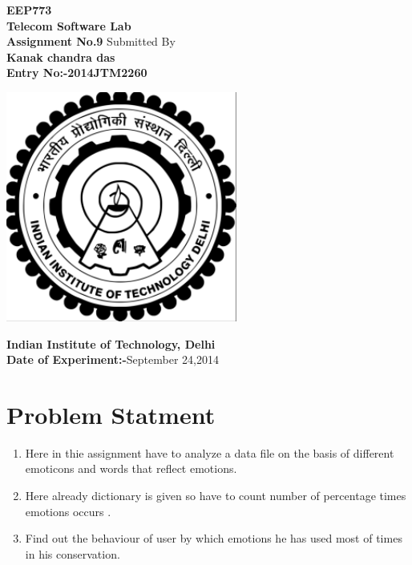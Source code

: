 \documentclass[a4paper,10pt]{report}
\date{}
\begin{document}
\begin{titlepage}
\centering
\vfill
\textbf{\Huge{EEP773
\linebreak
\\Telecom Software Lab}}\\
\vspace{2cm}
\textbf{\Large{Assignment No.9\vskip1cm}}
\vskip2cm
\large{Submitted By}\vskip0.02cm
\Large{\textbf{\\Kanak chandra das\\
Entry No:-2014JTM2260}}
\vskip1.5cm
\begin{center}
 \includegraphics[bb=0 0 384 360,scale=0.35]{./iitd_logo.png}
\end{center}

\vskip1cm
\textbf{
Indian Institute of Technology, Delhi\\
\vskip0.5cm
Date of Experiment:-}September 24,2014
\vfill
\end{titlepage}

\newpage
\tableofcontents
\newpage
\listoffigures
\newpage
\section{Problem Statment}
\begin{enumerate}
 \item Here in thie assignment have to analyze a data file on the basis of different emoticons and words that reflect emotions.
 \item Here already dictionary is given so have to count number of percentage times emotions occurs .
 \item Find out the behaviour of user by which emotions he has used most  of times  in his conservation.
\end{enumerate}
\newpage
\end{document}
